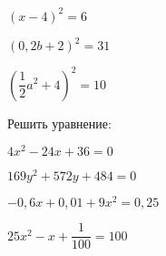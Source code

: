 \begin{class}[number=2]
\begin{listofex}
		\begin{enumcols}[itemcolumns=3]
			\item \( (x-4)^2=6 \)
			\item \( (0,2b+2)^2=31 \)
			\item \( \left( \dfrac{1}{2}a^2+4 \right)^2=10 \)
		\end{enumcols}
		\item Решить уравнение:
		\begin{enumcols}[itemcolumns=2]
			\item \( 4x^2-24x+36=0 \)
			\item \( 169y^2+572y+484=0 \)
			\item \( -0,6x+0,01+9x^2=0,25 \)
			\item \( 25x^2-x+\dfrac{1}{100}=100 \)
		\end{enumcols}
	\end{listofex}
\end{class}
%
%
%
%
%
%
%
